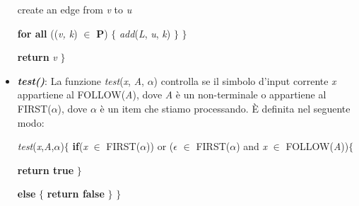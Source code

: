 \begin{itemize}
	\hspace{3.6cm} create an edge from \textit{v} to \textit{u}  \par
	\hspace{3.6cm} \textbf{for all} ((\textit{v, k}) $\in$ \textbf{\textbf{P}}) $\{$ \textit{add}(\textit{L}, \textit{u}, \textit{k}) $\}$ $\}$ \par  
	\hspace{3cm} \textbf{return} \textit{v} $\}$
	\item \textbf{\textit{test()}}: La funzione \textit{test}(\textit{x}, \textit{A}, $\alpha$) controlla se il simbolo d'input corrente \textit{x} appartiene al FOLLOW(\textit{A}), dove \textit{A} è un non-terminale o appartiene al FIRST($\alpha$), dove $\alpha$ è un item che stiamo processando. \`E definita nel seguente modo:\par
	\textit{test}(\textit{x},\textit{A},$\alpha$)$\{$ \textbf{if}(\textit{x} $\in$ FIRST($\alpha$)) or ($\epsilon$ $\in$ FIRST($\alpha$) and \textit{x} $\in$ FOLLOW(\textit{A}))$\{$ \par 
	\hspace{2.6cm}\textbf{ return true } $\}$\par 
	 \hspace{2.1cm}\textbf{else} $\{$ \textbf{return false} $\}$ $\}$
\end{itemize}
